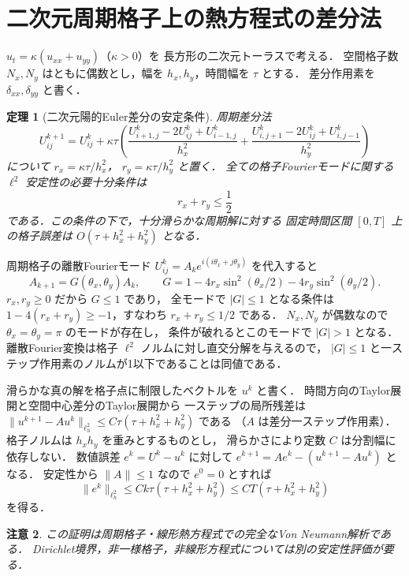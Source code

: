 \documentclass[a5paper,10pt,onecolumn]{jsarticle}
\makeatletter
\theoremstyle{mathnotetheorem}
\newtheorem{theorem}{定理}[section]
\newtheorem{remark}[theorem]{注意}
\renewcommand{\proofname}{証明}
\renewenvironment{proof}[1][\proofname]{%
  \par\pushQED{\qed}\normalfont\topsep4\p@\@plus2\p@\relax
  \trivlist\item[\hskip\labelsep\bfseries #1]\ignorespaces
}{\popQED\endtrivlist\@endpefalse}
\newcommand{\norm}[1]{\lVert #1\rVert}
\makeatother
\begin{document}
\section{二次元周期格子上の熱方程式の差分法}
$u_t=\kappa(u_{xx}+u_{yy})$（$\kappa>0$）を
長方形の二次元トーラスで考える．
空間格子数 $N_x,N_y$ はともに偶数とし，幅を
$h_x,h_y$，時間幅を $\tau$ とする．
差分作用素を $\delta_{xx},\delta_{yy}$ と書く．
\begin{theorem}[二次元陽的Euler差分の安定条件]
周期差分法
\[
 U^{k+1}_{ij}=U^k_{ij}+\kappa\tau
 \left(\frac{U^k_{i+1,j}-2U^k_{ij}+U^k_{i-1,j}}{h_x^2}
 +\frac{U^k_{i,j+1}-2U^k_{ij}+U^k_{i,j-1}}{h_y^2}\right)
\]
について $r_x=\kappa\tau/h_x^2$，
$r_y=\kappa\tau/h_y^2$ と置く．
全ての格子Fourierモードに関する $\ell^2$ 安定性の必要十分条件は
\[
 r_x+r_y\le\frac12
\]
である．この条件の下で，十分滑らかな周期解に対する
固定時間区間 $[0,T]$ 上の格子誤差は
$O(\tau+h_x^2+h_y^2)$ となる．
\end{theorem}
\begin{proof}
周期格子の離散Fourierモード
$U^k_{ij}=A_k e^{i(i\theta_x+j\theta_y)}$ を代入すると
\[
 A_{k+1}=G(\theta_x,\theta_y)A_k,\qquad
 G=1-4r_x\sin^2(\theta_x/2)-4r_y\sin^2(\theta_y/2).
\]
$r_x,r_y\ge0$ だから $G\le1$ であり，
全モードで $|G|\le1$ となる条件は
$1-4(r_x+r_y)\ge-1$，すなわち $r_x+r_y\le1/2$ である．
$N_x,N_y$ が偶数なので $\theta_x=\theta_y=\pi$ のモードが存在し，
条件が破れるとこのモードで $|G|>1$ となる．
離散Fourier変換は格子 $\ell^2$ ノルムに対し直交分解を与えるので，
$|G|\le1$ と一ステップ作用素のノルムが1以下であることは同値である．

滑らかな真の解を格子点に制限したベクトルを $u^k$ と書く．
時間方向のTaylor展開と空間中心差分のTaylor展開から
一ステップの局所残差は
$\norm{u^{k+1}-Au^k}_{\ell^2_h}
 \le C\tau(\tau+h_x^2+h_y^2)$ である
（$A$ は差分一ステップ作用素）．
格子ノルムは $h_xh_y$ を重みとするものとし，
滑らかさにより定数 $C$ は分割幅に依存しない．
数値誤差 $e^k=U^k-u^k$ に対して
$e^{k+1}=Ae^k-(u^{k+1}-Au^k)$ となる．
安定性から $\norm A\le1$ なので $e^0=0$ とすれば
\[
 \norm{e^k}_{\ell_h^2}
 \le Ck\tau(\tau+h_x^2+h_y^2)
 \le CT(\tau+h_x^2+h_y^2)
\]
を得る．
\end{proof}
\begin{remark}
この証明は周期格子・線形熱方程式での完全なVon Neumann解析である．
Dirichlet境界，非一様格子，非線形方程式については別の安定性評価が要る．
\end{remark}
\end{document}
